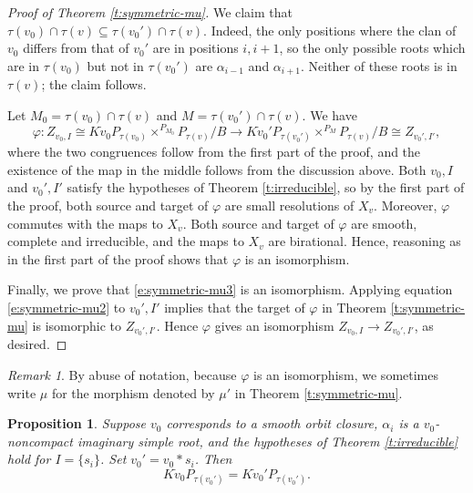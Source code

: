 \documentclass[11pt,letterpaper,reqno]{amsart}
\newcommand{\ga}{\alpha}
\numberwithin{equation}{section}
\theoremstyle{plain}
\newtheorem{proposition}[theorem]{Proposition}
\theoremstyle{definition}
\theoremstyle{remark}
\newtheorem{remark}[theorem]{Remark}
\begin{document}
\begin{proof}[Proof of Theorem \ref{t:symmetric-mu}]
We claim that $\tau(v_0) \cap \tau(v) \subseteq \tau(v_0') \cap \tau(v)$. Indeed, the only positions where
the clan of $v_0$ differs from that of $v_0'$ are in positions $i, i+1$, so
the only possible roots which are in $\tau(v_0)$ but not in $\tau(v_0')$
are $\ga_{i-1}$ and $\ga_{i+1}$.  Neither of these roots is in $\tau(v)$; the claim follows.

Let $M_0 = \tau(v_0) \cap \tau(v)$ and $M = \tau(v_0') \cap \tau(v)$.  We have
$$
\varphi:  Z_{v_0, I} \cong K \dot{v}_0 P_{\tau(v_0)} \times^{P_{M_0}} P_{\tau(v)}/B \to K \dot{v}_0' P_{\tau(v_0')} \times^{P_{M}} P_{\tau(v)}/B \cong Z_{v_0', I'},
$$
where the two congruences follow from the first part of the proof, and the existence of the map
in the middle follows from the discussion above.
Both $v_0, I$ and $v_0', I'$ satisfy the hypotheses of Theorem \ref{t:irreducible}, so by the first part of the proof,
both source and target of $\varphi$ are small resolutions of $X_v$.  Moreover, $\varphi$
commutes with the maps to $X_v$.   Both source and target of $\varphi$
are smooth, complete and irreducible, and the maps to $X_v$ are birational.
Hence, reasoning as in the first part of the proof
shows that $\varphi$ is an isomorphism.  

Finally, we prove that \eqref{e:symmetric-mu3} is an isomorphism.  Applying equation \eqref{e:symmetric-mu2}
to $v_0', I'$ implies
that the target of $\varphi$ in Theorem \ref{t:symmetric-mu}
is isomorphic to $Z_{v_0', I'}$.  Hence $\varphi$ gives an isomorphism
$Z_{v_0,I} \to Z_{v_0', I'}$, as desired. 
\end{proof}

\begin{remark}\label{r:symmetric-mu}
By abuse of notation, because $\varphi$ is an isomorphism, we sometimes write $\mu$ for the morphism denoted by
$\mu'$ in Theorem \ref{t:symmetric-mu}.
\end{remark}

\begin{proposition} \label{p:imag-noncompact}
Suppose $v_0$ corresponds to a smooth orbit closure, $\ga_i$ is a $v_0$-noncompact imaginary simple root,
and the hypotheses of Theorem \ref{t:irreducible}  hold for $I = \{ s_i \}$. 
Set $v_0' = v_0 * s_{i}$.  Then
\begin{equation} \label{e:para-equal}
K \dot{v}_0 P_{\tau(v_0')} = K \dot{v}_0' P_{\tau(v_0')}.
\end{equation}
\end{proposition}
\end{document}
